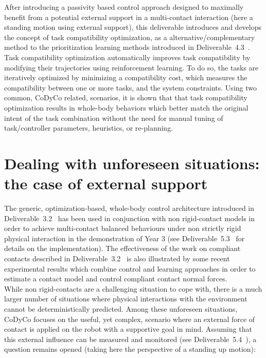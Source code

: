 \documentclass[12pt,a4paper,twoside]{article}
\begin{document}
After introducing a passivity based control approach designed to maximally benefit from a potential external support in a multi-contact interaction (here  a standing motion using external support), %
this deliverable introduces and develops the concept of task compatibility optimization, as a alternative/complementary method to the prioritization learning methods introduced in Deliverable~4.3~\cite{deliverable43}. Task compatibility optimization automatically improves task compatibility by modifying their trajectories using reinforcement learning. To do so, the tasks are iteratively optimized by minimizing a compatibility cost, which measures the compatibility between one or more tasks, and the system constraints. Using two common, CoDyCo related, scenarios, it is shown that that task compatibility optimization results in whole-body behaviors which better match the original intent of the task combination without the need for manual tuning of task/controller parameters, heuristics, or re-planning.

\section{Dealing with unforeseen situations: the case of external support}
\label{sec:controller}

%

The generic, optimization-based, whole-body control architecture introduced in Deliverable~3.2~\cite{deliverable32} has been used in conjunction with non rigid-contact models in order to achieve multi-contact balanced behaviours under non strictly rigid physical interaction in the demonstration of Year 3 (see Deliverable~5.3~\cite{deliverable53} for details on the implementation). The effectiveness of the work on compliant contacts described in Deliverable~3.2~\cite{deliverable32} is also illustrated by some recent experimental results \underline{\bf \cite{Azad_2016_Humanoids}} which combine control and learning approaches in order to  estimate a contact model and control compliant contact normal forces.\\

While non rigid-contacts are a challenging situation to cope with, there is a much larger number of situations where physical interactions with the environment cannot be deterministically predicted. Among these unforeseen situations, CoDyCo focuses on the useful, yet complex, scenario where an external force of contact is applied on the robot with a supportive goal in mind. Assuming that this external influence can be measured and monitored (see Deliverable~5.4~\cite{deliverable54}), a question remains opened (taking here the perspective of a standing up motion):
\end{document}
